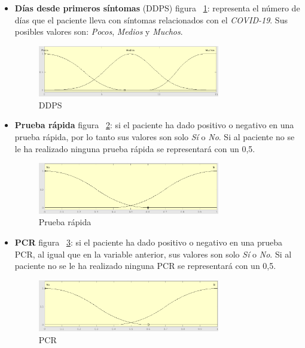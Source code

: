 \documentclass[12pt,a4paper, xcolor=table]{article}
\begin{document}
\begin{itemize}
  \item \textbf{Días desde primeros síntomas} (DDPS) figura ~\ref{DDPS}: representa el número de días que el paciente lleva con síntomas relacionados con el \textit{COVID-19}. Sus posibles valores son: \textit{Pocos}, \textit{Medios} y \textit{Muchos}.

  \begin{figure}[!h]
      \centering
      \includegraphics[width=300px]{img/dias_primeros_sintomas.png}
      \caption{DDPS}
      \label{DDPS}
  \end{figure}

  \item \textbf{Prueba rápida} figura ~\ref{PR}: si el paciente ha dado positivo o negativo en una prueba rápida, por lo tanto sus valores son solo \textit{Sí} o \textit{No}. Si al paciente no se le ha realizado ninguna prueba rápida se representará con un 0,5.

  \begin{figure}[!h]
      \centering
      \includegraphics[width=300px]{img/prueba_rapida.png}
      \caption{Prueba rápida}
      \label{PR}
  \end{figure}

  \item \textbf{PCR} figura ~\ref{PCR}: si el paciente ha dado positivo o negativo en una prueba PCR, al igual que en la variable anterior, sus valores son solo \textit{Sí} o \textit{No}. Si al paciente no se le ha realizado ninguna PCR se representará con un 0,5.

  \begin{figure}[!h]
      \centering
      \includegraphics[width=300px]{img/PCR.png}
      \caption{PCR}
      \label{PCR}
  \end{figure}


\end{itemize}
\end{document}
